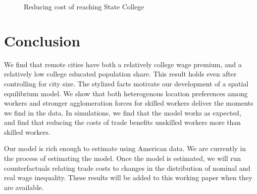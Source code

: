 \documentclass{article}
\begin{document}
\begin{figure}[ht!]

\centering
\caption{\label{fig:sim_res} Reducing cost of reaching State College}
\end{figure}

\section{Conclusion}

We find that remote cities have both a relatively college wage premium, and a relatively low college educated population share.  This result holds even after controlling for city size.  The stylized facts motivate our development of a spatial equilibrium model.  We show that both heterogenous location preferences among workers and stronger agglomeration forces for skilled workers deliver the moments we find in the data.  In simulations, we find that the model works as expected, and find that reducing the costs of trade benefits unskilled workers more than skilled workers.

Our model is rich enough to estimate using American data.  We are currently in the process of estimating the model.  Once the model is estimated, we will run counterfactuals relating trade costs to changes in the distribution of nominal and real wage inequality.  These results will be added to this working paper when they are available.
\end{document}
